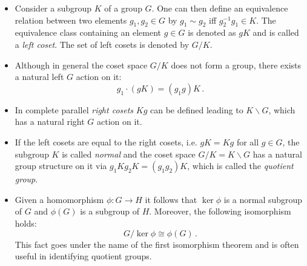 \documentclass[11pt,a4paper]{article}
\begin{document}
    \begin{itemize}
    	\item Consider a subgroup $K$ of a group $G$. One can then define an equivalence relation between two elements $g_1, g_2\in G$ by $g_1\sim g_2$ iff $g_2^{-1}g_1 \in K$. The equivalence class containing an element $g\in G$ is denoted as $gK$ and is called a {\it left coset}. The set of left cosets is denoted by $G/K$. 
    	\item Although in general the coset space $G/K$ does not form a group, there exists a natural left $G$ action on it: 
    	\begin{equation}
    	g_1\cdot (gK)=(g_1g)K\,.\label{groupaction}
    	\end{equation}
    	\item In complete parallel {\it right cosets} $Kg$ can be defined leading to $K\backslash G$, which has a natural right $G$ action on it. 
    	\item If the left cosets are equal to the right cosets, i.e. $gK=Kg$ for all $g\in G$, the subgroup $K$ is called {\it normal} and the coset space $G/K=K\backslash G$ has a natural group structure on it via $g_1 K g_2 K=(g_1 g_2)K$, which is called the {\it quotient group}. 
    	\item Given a homomorphism $\phi : G\rightarrow H$ it follows that $\ker\phi$ is a normal subgroup of $G$ and $\phi(G)$ is a subgroup of $H$. Moreover, the following isomorphism holds:
    	\begin{equation}
    	G/\ker \phi\cong \phi(G)\,.
    	\end{equation}
    	This fact goes under the name of the first isomorphism theorem and is often useful in identifying quotient groups.  
    \end{itemize}
    
    
    
    
    
    
    
\end{document}
